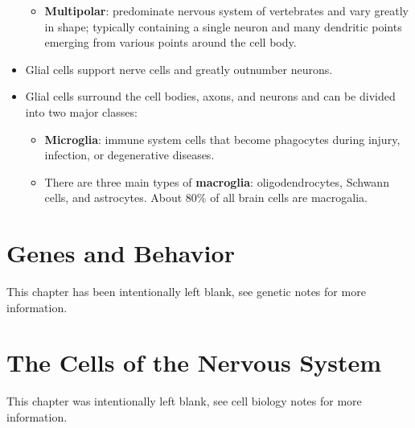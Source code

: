 \documentclass[12pt,a4paper]{article}
\begin{document}
\begin{itemize}
\begin{itemize}
            \item \textbf{Multipolar}: predominate nervous system of vertebrates and vary greatly in shape; typically containing a single neuron and many dendritic points emerging from various points around the cell body.
        \end{itemize}
    \item Glial cells support nerve cells and greatly outnumber neurons. 
    \item Glial cells surround the cell bodies, axons, and neurons and can be divided into two major classes:
        \begin{itemize}
            \item \textbf{Microglia}: immune system cells that become phagocytes during injury, infection, or degenerative diseases. 
            \item There are three main types of \textbf{macroglia}: oligodendrocytes, Schwann cells, and astrocytes. About 80\% of all brain cells are macrogalia.
        \end{itemize}
\end{itemize}

\clearpage
\section{Genes and Behavior}

\begin{center}
    This chapter has been intentionally left blank, see genetic notes for more information.
\end{center}

\clearpage
{}
\clearpage
\section{The Cells of the Nervous System}
\begin{center}
    This chapter was intentionally left blank, see cell biology notes for more information. 
\end{center}
\end{document}
